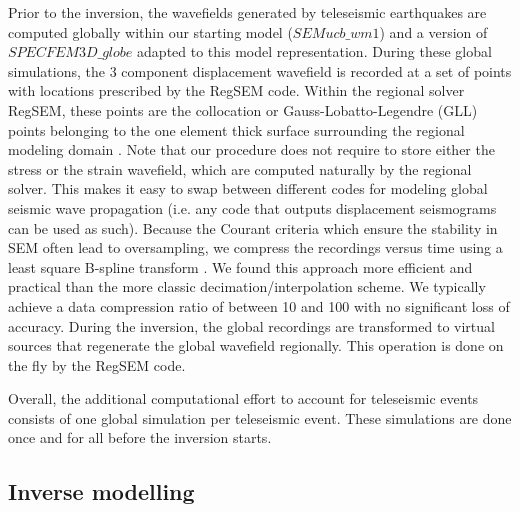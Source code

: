 \documentclass[12pt]{article}
\begin{document}
Prior to the inversion, the wavefields generated by teleseismic earthquakes are computed globally within our starting model ($SEMucb\_wm1$) and a version of $SPECFEM3D\_globe$ \citep{komatitsch2002spectrala} adapted to this model representation. 
During these global simulations, the 3 component displacement wavefield is recorded at a set of points with locations prescribed by the RegSEM code.
Within the regional solver RegSEM, these points are the collocation or Gauss-Lobatto-Legendre (GLL) points belonging to the one element thick surface surrounding the regional modeling domain \citep[see][]{masson2013numerical}. 
Note that our procedure does not require to store either the stress or the strain wavefield, which are computed naturally by the regional solver. This makes it easy to swap between different codes for modeling global seismic wave propagation (i.e. any code that outputs displacement seismograms can be used as such).
Because the Courant criteria which ensure the stability in SEM often lead to oversampling, we compress the recordings versus time using a least square B-spline transform \citep{unser1993a,unser1993b}. We found this  approach more efficient and practical than the more classic decimation/interpolation scheme.
We typically achieve a data compression ratio of between 10 and 100 with no significant loss of accuracy. 
During the inversion, the global recordings are transformed to virtual sources that regenerate the global wavefield regionally. 
This operation is done on the fly by the RegSEM code.

Overall, the additional computational effort to account for teleseismic events consists of one global simulation per teleseismic event. These simulations are done once and for all before the inversion starts.

\subsection{Inverse modelling}
\end{document}
